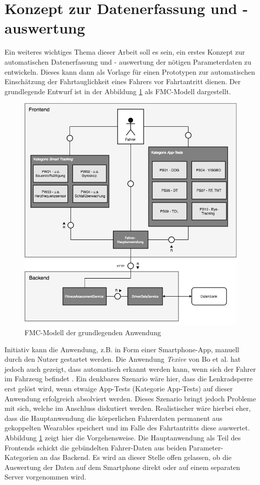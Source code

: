 \section{Konzept zur Datenerfassung und - auswertung}
\label{concept}
Ein weiteres wichtiges Thema dieser Arbeit soll es sein, ein erstes Konzept zur automatischen Datenerfassung und - auswertung der nötigen Parameterdaten zu entwickeln. Dieses kann dann als Vorlage für einen Prototypen zur automatischen Einschätzung der Fahrtauglichkeit eines Fahrers vor Fahrtantritt dienen. Der grundlegende Entwurf ist in der Abbildung \ref{fig:conceptfmc} als FMC-Modell dargestellt.

\begin{figure}
	\centering
	\includegraphics[width=\linewidth]{images/ConceptDriverAssessmentData}
	\caption[Caption for concept]{FMC-Modell der grundlegenden Anwendung}
	\label{fig:conceptfmc}
\end{figure}

Initiativ kann die Anwendung, z.B. in Form einer Smartphone-App, manuell durch den Nutzer gestartet werden. Die Anwendung \textit{Texive} von Bo et al. hat jedoch auch gezeigt, dass automatisch erkannt werden kann, wenn sich der Fahrer im Fahrzeug befindet \cite{texive}. Ein denkbares Szenario wäre hier, dass die Lenkradsperre erst gelöst wird, wenn etwaige App-Tests (Kategorie App-Tests) auf dieser Anwendung erfolgreich absolviert werden. Dieses Szenario bringt jedoch Probleme mit sich, welche im Anschluss diskutiert werden. Realistischer wäre hierbei eher, dass die Hauptanwendung die körperlichen Fahrerdaten permanent aus gekoppelten  Wearables speichert und im Falle des Fahrtantritts diese auswertet. Abbildung \ref{fig:conceptfmc} zeigt hier die Vorgehensweise. Die Hauptanwendung als Teil des Frontends schickt die gebündelten Fahrer-Daten aus beiden Parameter-Kategorien an das Backend. Es wird an dieser Stelle offen gelassen, ob die Auswertung der Daten auf dem Smartphone direkt oder auf einem separaten Server vorgenommen wird.

